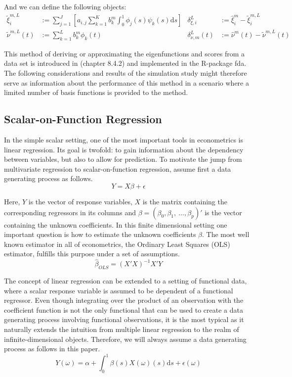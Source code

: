 \documentclass[11pt,twoside,a4paper]{article}
\begin{document}
	And we can define the following objects:
		\begin{align}
			\tilde{\xi}^{m,L}_{i} & := \sum_{j = 1}^{J} \left[a_{i,j}\sum_{k = 1}^{K} b_{k}^m \int_{0}^{1} \phi_j(s) \psi_{k}(s)\mathrm{d}s \right] 
			& \delta_{\xi, i}^L & := \hat{\xi}_{i}^m - \tilde{\xi}^{m,L}_{i} \\
			\tilde{\nu}^{m,L}(t) & := \sum_{k = 1}^{L} b_{k}^m \phi_{k}(t) 
			& \delta_{\nu, m}^L(t) & := \hat{\nu}^m(t) - \tilde{\nu}^{m,L}(t)
		\end{align}	
	
	This method of deriving or approximating the eigenfunctions and scores from a data set is introduced in \cite{ramsay_functional_2005} (chapter 8.4.2) and implemented in the R-package fda. The following considerations and results of the simulation study might therefore serve as information about the performance of this method in a scenario where a limited number of basis functions is provided to the method.
	
	\subsection{Scalar-on-Function Regression}
	In the simple scalar setting, one of the most important tools in econometrics is linear regression. Its goal is twofold: to gain information about the dependency between variables, but also to allow for prediction. To motivate the jump from multivariate regression to scalar-on-function regression, assume first a data generating process as follows.
	\begin{equation}
		Y = X\beta + \epsilon
	\end{equation}
	
	Here, $Y$ is the vector of response variables, $X$ is the matrix containing the corresponding regressors in its columns and $\beta = (\beta_0, \beta_1, \: \dots, \beta_p)'$ is the vector containing the unknown coefficients.
	In this finite dimensional setting one important question is how to estimate the unknown coefficients $\beta$. The most well known estimator in all of econometrics, the Ordinary Least Squares (OLS) estimator, fulfills this purpose under a set of assumptions.
	\begin{equation}
		\hat{\beta}_{OLS} = (X'X)^{-1}X'Y
	\end{equation}
	
	The concept of linear regression can be extended to a setting of functional data, where a scalar response variable is assumed to be dependent of a functional regressor. 
	Even though integrating over the product of an observation with the coefficient function is not the only functional that can be used to create a data generating process involving functional observations, it is the most typical as it naturally extends the intuition from multiple linear regression to the realm of infinite-dimensional objects. Therefore, we will always assume a data generating process as follows in this paper.
	\begin{equation}\label{DGP}
		Y(\omega) = \alpha + \int_{0}^{1} \beta(s)X(\omega)(s) \mathrm{d}s + \epsilon(\omega)
	\end{equation}
	
\end{document}

